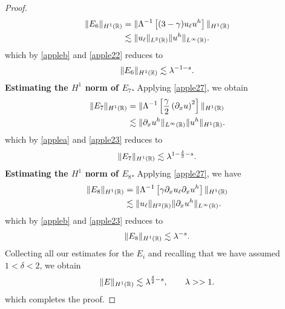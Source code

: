 \begin{proof}
\begin{equation}
\begin{split}
		\|E_6\|_{H^1(\mathbb{R})} 
		& = \|\Lambda^{-1} \left[ (3 -\gamma) u_\ell u^h \right]\|_{H^1(\mathbb{R})}
		\\
		& \lesssim \|u_\ell\|_{L^2(\mathbb{R})} \|u^h\|_{L^\infty(\mathbb{R})}.
		\label{apple30}
	\end{split}
\end{equation}
which by  \cref{appleb} and \eqref{apple22} reduces to
\begin{equation}
	\begin{split}
		\|E_6\|_{H^1(\mathbb{R})} \lesssim \lambda^{-1-s}.
		\label{apple31}
	\end{split}
\end{equation}
%
%
%
%
%
{\bf Estimating the $H^1$ norm of $\hyperref[all_errors_together]{E_7}$.} Applying \eqref{apple27}, we obtain
\begin{equation}
	\begin{split}
		\|E_7\|_{H^1(\mathbb{R})} 
		& = \|\Lambda^{-1} \left[ \frac{\gamma}{2}\left( \partial_x u \right)^2
		\right]\|_{H^1(\mathbb{R})}
		\\
		& \lesssim  \|\partial_x u^h\|_{L^\infty(\mathbb{R})} \|u^h\|_{H^1(\mathbb{R})}.
		\label{apple32}
	\end{split}
\end{equation}
which by  \cref{applea} and \eqref{apple23} reduces to
\begin{equation}
	\begin{split}
		\|E_7\|_{H^1(\mathbb{R})} \lesssim \lambda^{1-\frac{\delta}{2}-s}.
		\label{apple33'}
	\end{split}
\end{equation}
%
%
%
%
%
{\bf Estimating the $H^1$ norm of $\hyperref[all_errors_together]{E_8}$.} Applying \eqref{apple27}, we have
\begin{equation}
	\begin{split}
		\|E_8\|_{H^1(\mathbb{R})}
		& = \|\Lambda^{-1}\left[ \gamma \partial_x u_\ell \partial_x u^h \right]\|_{H^1(\mathbb{R})}
		\\
		& \lesssim \|u_\ell\|_{H^2(\mathbb{R})} \|\partial_x u^h\|_{L^\infty(\mathbb{R})}.
		\label{apple33}
	\end{split}
\end{equation}
which by  \cref{appleb} and \eqref{apple23} reduces to
\begin{equation}
	\begin{split}
		\|E_8\|_{H^1(\mathbb{R})} \lesssim \lambda^{-s}.
		\label{apple34}
	\end{split}
\end{equation}
Collecting all our estimates for the $E_i$ and recalling that we have assumed
$1<\delta<2$, we obtain
\begin{equation*}
	\begin{split}
		\|E\|_{H^1(\mathbb{R})}
		 \lesssim \lambda^{\frac{\delta}{2} -s }, \qquad \lambda >>1.
	\end{split}
\end{equation*}
which completes the proof.
\end{proof}
%
%
%
%
%
